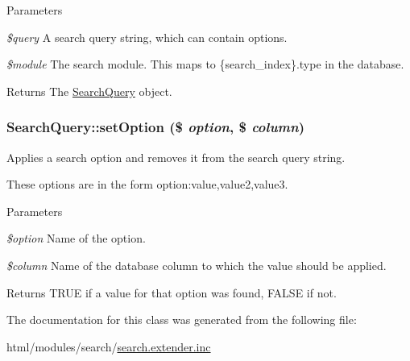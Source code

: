 \begin{DoxyParams}{Parameters}
\item[{\em \$query}]A search query string, which can contain options. \item[{\em \$module}]The search module. This maps to \{search\_\-index\}.type in the database.\end{DoxyParams}
\begin{DoxyReturn}{Returns}
The \hyperlink{classSearchQuery}{SearchQuery} object. 
\end{DoxyReturn}
\hypertarget{classSearchQuery_a8923957ea4c9d231d1975c249ebe2601}{
\subsubsection[{setOption}]{\setlength{\rightskip}{0pt plus 5cm}SearchQuery::setOption (\$ {\em option}, \/  \$ {\em column})}}
\label{classSearchQuery_a8923957ea4c9d231d1975c249ebe2601}
Applies a search option and removes it from the search query string.

These options are in the form option:value,value2,value3.


\begin{DoxyParams}{Parameters}
\item[{\em \$option}]Name of the option. \item[{\em \$column}]Name of the database column to which the value should be applied.\end{DoxyParams}
\begin{DoxyReturn}{Returns}
TRUE if a value for that option was found, FALSE if not. 
\end{DoxyReturn}


The documentation for this class was generated from the following file:\begin{DoxyCompactItemize}
\item 
html/modules/search/\hyperlink{search_8extender_8inc}{search.extender.inc}\end{DoxyCompactItemize}
